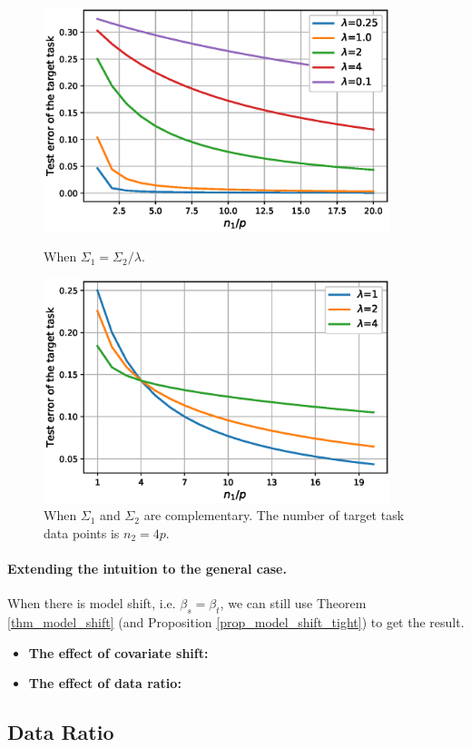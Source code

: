 \begin{figure}
	\centering
	\begin{minipage}{0.48\textwidth}
		\centering
		\includegraphics[width=0.9\textwidth]{figures/scaling.eps}
		\caption{When $\Sigma_1 = \Sigma_2 / \lambda$.}
		\label{fig_te_scaling}
	\end{minipage}\hfill
	\begin{minipage}{0.48\textwidth}
		\centering
		\includegraphics[width=0.9\textwidth]{figures/complementary.eps}
		\caption{When $\Sigma_1$ and $\Sigma_2$ are complementary. The number of target task data points is $n_2 = 4p$.}
		\label{fig_te_complement}
	\end{minipage}
\end{figure}


\paragraph{Extending the intuition to the general case.}
When there is model shift, i.e. $\beta_s = \beta_t$, we can still use Theorem \ref{thm_model_shift} (and Proposition \ref{prop_model_shift_tight}) to get the result.
\begin{itemize}
	\item \textbf{The effect of covariate shift:}
	\item \textbf{The effect of data ratio:}
\end{itemize}



\subsection{Data Ratio}


















